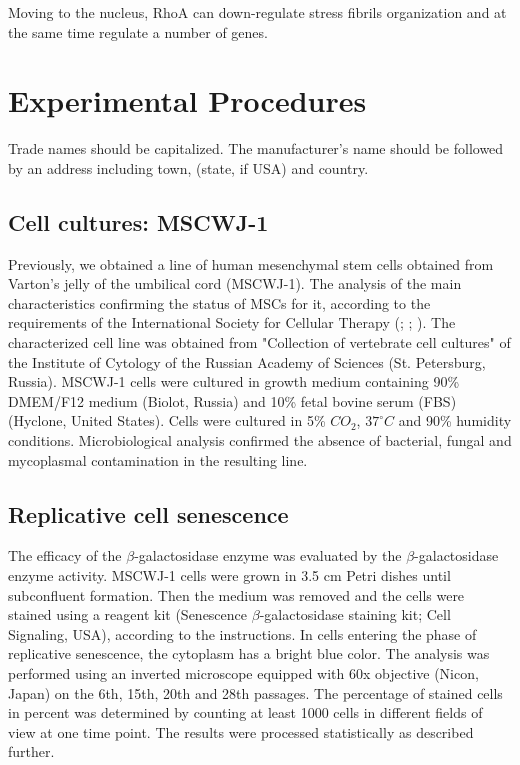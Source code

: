 \documentclass[alpha-refs]{wiley-article}
\begin{document}
 Moving to the nucleus, RhoA can down-regulate stress fibrils organization and at the same time regulate a number of genes.


\section{Experimental Procedures}

Trade names should be capitalized. The manufacturer's name should be followed by an address including town, (state, if USA) and country.

\subsection{Cell cultures: MSCWJ-1}

Previously, we obtained a line of human mesenchymal stem cells obtained from Varton's jelly of the umbilical cord (MSCWJ-1).
The analysis of the main characteristics confirming the status of MSCs for it, according to the requirements of the International Society for Cellular Therapy (\cite{dominici2006minimal}; \cite{sensebe2010mesenchymal}; \cite{krylova2017derivation}).
The characterized cell line was obtained from "Collection of vertebrate cell cultures" of the Institute of Cytology of the Russian Academy of Sciences (St. Petersburg, Russia).
MSCWJ-1 cells were cultured in growth medium containing 90\% DMEM/F12 medium (Biolot, Russia) and 10\% fetal bovine serum (FBS) (Hyclone, United States).
Cells were cultured in 5\% $CO_2$, $37^{\circ}  C$ and 90\% humidity conditions.
Microbiological analysis confirmed the absence of bacterial, fungal and mycoplasmal contamination in the resulting line.

\subsection{Replicative cell senescence}

The efficacy of the $\beta$-galactosidase enzyme was evaluated by the $\beta$-galactosidase enzyme activity.
MSCWJ-1 cells were grown in 3.5 cm Petri dishes until subconfluent formation.
Then the medium was removed and the cells were stained using a reagent kit (Senescence $\beta$-galactosidase staining kit; Cell Signaling, USA), according to the instructions.
In cells entering the phase of replicative senescence, the cytoplasm has a bright blue color.
The analysis was performed using an inverted microscope equipped with 60x objective (Nicon, Japan) on the 6th, 15th, 20th and 28th passages.
The percentage of stained cells in percent was determined by counting at least 1000 cells in different fields of view at one time point.
The results were processed statistically as described further.
\end{document}
